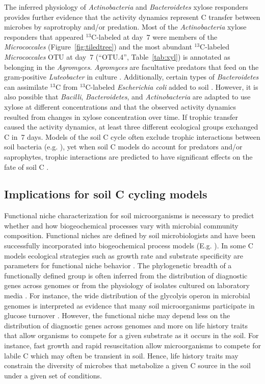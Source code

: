 The inferred physiology of \textit{Actinobacteria} and \textit{Bacteroidetes}
xylose responders provides further evidence that the activity dynamics
represent C transfer between microbes by saprotrophy and/or predation. Most of
the \textit{Actinobacteria} xylose responders that appeared $^{13}$C-labeled at
day~7 were members of the \textit{Micrococcales} (Figure~\ref{fig:tiledtree})
and the most abundant $^{13}$C-labeled \textit{Micrococcales} OTU at day~7
(“OTU.4”, Table~\ref{tab:xyl}) is annotated as belonging in the
\textit{Agromyces}. \textit{Agromyces} are facultative predators that feed on
the gram-positive \textit{Luteobacter} in culture \citep{16346402}.
Additionally, certain types of \textit{Bacteroidetes} can assimilate $^{13}$C
from $^{13}$C-labeled \textit{Escherichia coli} added to soil
\citep{Lueders2006}. However, it is also possible that \textit{Bacilli},
\textit{Bacteroidetes}, and \textit{Actinobacteria} are adapted to use xylose
at different concentrations and that the observed activity dynamics resulted
from changes in xylose concentration over time. If trophic transfer caused the
activity dynamics, at least three different ecological groups exchanged C in~7
days. Models of the soil C cycle often exclude trophic interactions between
soil bacteria (e.g. \citep{Moore1988}), yet when soil C models do account for
predators and/or saprophytes, trophic interactions are predicted to have
significant effects on the fate of soil C \citep{Kaiser2014a}. 

\subsection{Implications for soil C cycling models}
Functional niche characterization for soil microorganisms is necessary to
predict whether and how biogeochemical processes vary with microbial community
composition. Functional niches are defined by soil microbiologists and have
been successfully incorporated into biogeochemical process models (E.g.
\citep{wieder_2014a,Kaiser2014a}). In some C models ecological strategies such
as growth rate and substrate specificity are parameters for functional niche
behavior \citep{Kaiser2014a}. The phylogenetic breadth of a functionally
defined group is often inferred from the distribution of diagnostic genes
across genomes \citep{Berlemont2013} or from the physiology of isolates
cultured on laboratory media \citep{Martiny2013}. For instance, the wide
distribution of the glycolyis operon in microbial genomes is interpreted as
evidence that many soil microorganisms participate in glucose turnover
\citep{McGuire2010}. However, the functional niche may depend less on the
distribution of diagnostic genes across genomes and more on life history traits
that allow organisms to compete for a given substrate as it occurs in the soil.
For instance, fast growth and rapid resuscitation allow microorganisms to
compete for labile C which may often be transient in soil. Hence, life history
traits may constrain the diversity of microbes that metabolize a given C source
in the soil under a given set of conditions.

